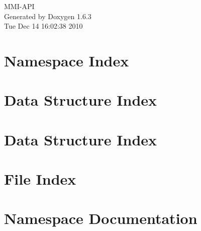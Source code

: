\documentclass[a4paper]{book}
\begin{document}
\hypersetup{pageanchor=false}
\begin{titlepage}
\vspace*{7cm}
\begin{center}
{\Large MMI-\/API }\\
\vspace*{1cm}
{\large Generated by Doxygen 1.6.3}\\
\vspace*{0.5cm}
{\small Tue Dec 14 16:02:38 2010}\\
\end{center}
\end{titlepage}
\clearemptydoublepage
{}
\tableofcontents
\clearemptydoublepage
{}
\hypersetup{pageanchor=true}
\chapter{Namespace Index}

\chapter{Data Structure Index}

\chapter{Data Structure Index}

\chapter{File Index}

\chapter{Namespace Documentation}












\end{document}
